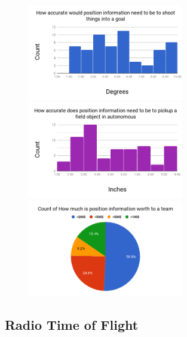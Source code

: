 \documentclass{article}
\begin{document}
    \begin{figure}[H]
      \centering
      \includegraphics[height=4.2cm]{./images/survey_angle.png}
      \includegraphics[height=4.2cm]{./images/survey_position.png}
      \includegraphics[height=4.2cm]{./images/survey_worth.png}
      \label{fig:survey_imgs}
    \end{figure}

  \subsection{Radio Time of Flight}\label{appendix:rf-rx-tx}
\end{document}
